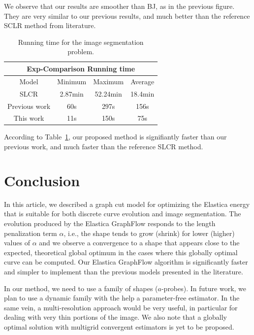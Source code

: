 \documentclass[runningheads]{llncs}
\begin{document}
 We observe that our results are smoother than BJ, as in the previous figure. They are very similar to our previous
 results, and much better than the reference SCLR method from literature.

\begin{table}
  \centering
 \caption{Running time for the image segmentation problem.}
\label{ch9:tab:rtime-image-segmentation-general} 
\captionsetup{type=table}
\begin{tabular}{|c|c|c|c|}
\hline
\multicolumn{4}{|c|}{Exp-Comparison Running time}\\
\hline
Model & Minimum & Maximum & Average \\
\hline
SLCR & 2.87min & 52.24min & 18.4min\\
Previous work & 60s & 297s & 156s\\
This work  & 11s & 150s & 75s\\
\hline
\end{tabular}
\end{table}

According to Table~\ref{ch9:tab:rtime-image-segmentation-general}, our proposed method is signifiantly faster than
our previous work, and much faster than the reference SLCR method.

\section{Conclusion}
In this article, we described a graph cut model for optimizing the Elastica energy that is suitable for both discrete curve evolution and
image segmentation. The evolution produced by the Elastica GraphFlow responds to the length penalization term $\alpha$,
i.e., the shape tends to grow (shrink) for lower (higher) values of $\alpha$ and we observe a convergence to a shape
that appears close to the expected, theoretical global optimum in the cases where this globally optimal curve can be
computed. Our Elastica GraphFlow algorithm is significantly faster and simpler to implement than the previous models
presented in the literature.

In our method, we need to use a family of shapes ($a$-probes). In future work, we plan to use a dynamic family with the
help a parameter-free estimator. In the same vein, a multi-resolution approach would be very useful, in particular for
dealing with very thin portions of the image. We also note that a globally optimal solution with multigrid convergent
estimators is yet to be proposed. 



\end{document}
